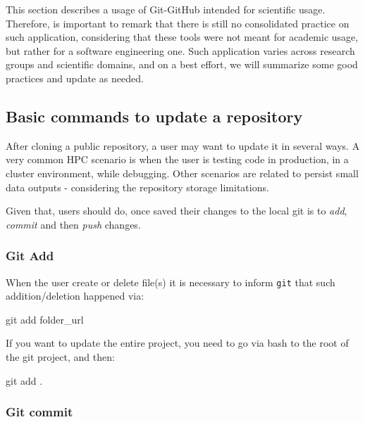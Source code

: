 \documentclass[
]{book}
\newenvironment{Shaded}{\begin{snugshade}}{\end{snugshade}}
\newcommand{\FunctionTok}[1]{\textcolor[rgb]{0.00,0.00,0.00}{#1}}
\newcommand{\NormalTok}[1]{#1}
\begin{document}
This section describes a usage of Git-GitHub intended for scientific usage. Therefore,
is important to remark that there is still no consolidated practice on such application,
considering that these tools were not meant for academic usage, but rather for a software
engineering one. Such application varies across research groups and scientific domains, and on a best effort, we will summarize some good practices and update as needed.

\hypertarget{basic-commands-to-update-a-repository}{%
\subsection{Basic commands to update a repository}\label{basic-commands-to-update-a-repository}}

After cloning a public repository, a user may want to update it in several ways.
A very common HPC scenario is when the user is testing code in production,
in a cluster environment, while debugging. Other scenarios are related to persist
small data outputs - considering the repository storage limitations.

Given that, users should do, once saved their changes to the local git is to
\emph{add}, \emph{commit} and then \emph{push} changes.

\hypertarget{git-add}{%
\subsubsection{Git Add}\label{git-add}}

When the user create or delete file(s) it is necessary to inform \texttt{git} that such
addition/deletion happened via:

\begin{Shaded}
\begin{Highlighting}[]
\FunctionTok{git}\NormalTok{ add folder\_url}
\end{Highlighting}
\end{Shaded}

If you want to update the entire project, you need to go via bash to the root of
the git project, and then:

\begin{Shaded}
\begin{Highlighting}[]
\FunctionTok{git}\NormalTok{ add .}
\end{Highlighting}
\end{Shaded}

\hypertarget{git-commit}{%
\subsubsection{Git commit}\label{git-commit}}
\end{document}
